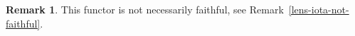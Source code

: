 \documentclass[11pt,letterpaper]{article}
\theoremstyle{plain}
\newtheorem{theorem}{Theorem}[subsection]
\theoremstyle{definition}
\newtheorem{remark}[theorem]{Remark}
\newcommand{\C}{\mathscr{C}}
\newcommand{\Optic}{\mathbf{Optic}}
\newcommand{\todo}[1]{\textcolor{red}{\small #1}}
\begin{document}
\begin{remark}
  This functor is not necessarily faithful, see Remark~\ref{lens-iota-not-faithful}.
\end{remark}


\end{document}
